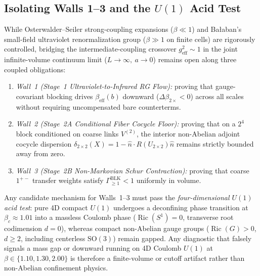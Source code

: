 \documentclass[11pt,a4paper]{article}
\begin{document}
\subsection{Isolating Walls 1--3 and the $U(1)$ Acid Test}
While Osterwalder--Seiler strong-coupling expansions ($\beta \ll 1$) and Ba{\l}aban's small-field ultraviolet renormalization group ($\beta \gg 1$ on finite cells) are rigorously controlled, bridging the intermediate-coupling crossover $g_{\mathrm{eff}}^2 \sim 1$ in the joint infinite-volume continuum limit ($L \to \infty,\ a \to 0$) remains open along three coupled obligations:
\begin{enumerate}
\item \emph{Wall~1 (Stage~1 Ultraviolet-to-Infrared RG Flow):} proving that gauge-covariant blocking drives $\beta_{\mathrm{eff}}(b)$ downward ($\Delta\beta_{2\times} < 0$) across all scales without requiring uncompensated bare counterterms.
\item \emph{Wall~2 (Stage~2A Conditional Fiber Cocycle Floor):} proving that on a $2^4$ block conditioned on coarse links $V^{(2)}$, the interior non-Abelian adjoint cocycle dispersion $\delta_{2\times 2}(X) = 1 - \hat{n}\cdot R(U_{2\times 2})\hat{n}$ remains strictly bounded away from zero.
\item \emph{Wall~3 (Stage~2B Non-Markovian Schur Contraction):} proving that coarse $1^{+-}$ transfer weights satisfy $\Gamma_{\ge 1}^{\mathrm{BLK}} < 1$ uniformly in volume.
\end{enumerate}
Any candidate mechanism for Walls~1--3 must pass the \emph{four-dimensional $U(1)$ acid test}: pure 4D compact $U(1)$ undergoes a deconfining phase transition at $\beta_c \approx 1.01$ into a massless Coulomb phase ($\operatorname{Ric}(S^1) = 0$, transverse root codimension $d = 0$), whereas compact non-Abelian gauge groups ($\operatorname{Ric}(G) > 0$, $d \ge 2$, including centerless $\mathrm{SO}(3)$) remain gapped. Any diagnostic that falsely signals a mass gap or downward running on 4D Coulomb $U(1)$ at $\beta \in \{1.10, 1.30, 2.00\}$ is therefore a finite-volume or cutoff artifact rather than non-Abelian confinement physics.
\end{document}
